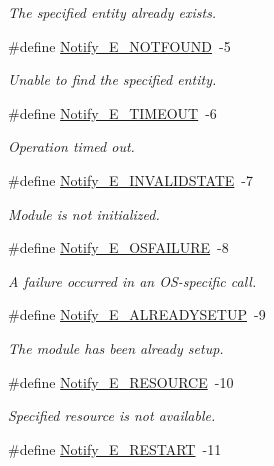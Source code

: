 \begin{DoxyCompactItemize}
\begin{DoxyCompactList}\small\item\em The specified entity already exists. \end{DoxyCompactList}\item 
\#define \hyperlink{_notify_8h_a1c9a19382cfb8c48de9bc3e52e9f7635}{Notify\-\_\-\-E\-\_\-\-N\-O\-T\-F\-O\-U\-N\-D}~-\/5
\begin{DoxyCompactList}\small\item\em Unable to find the specified entity. \end{DoxyCompactList}\item 
\#define \hyperlink{_notify_8h_a546b13cc1d684582073aaa256652fbc4}{Notify\-\_\-\-E\-\_\-\-T\-I\-M\-E\-O\-U\-T}~-\/6
\begin{DoxyCompactList}\small\item\em Operation timed out. \end{DoxyCompactList}\item 
\#define \hyperlink{_notify_8h_a14366d0247e7dda6144f851b60121125}{Notify\-\_\-\-E\-\_\-\-I\-N\-V\-A\-L\-I\-D\-S\-T\-A\-T\-E}~-\/7
\begin{DoxyCompactList}\small\item\em Module is not initialized. \end{DoxyCompactList}\item 
\#define \hyperlink{_notify_8h_a62c9f5fc1a523a1d7efc2685c939a92b}{Notify\-\_\-\-E\-\_\-\-O\-S\-F\-A\-I\-L\-U\-R\-E}~-\/8
\begin{DoxyCompactList}\small\item\em A failure occurred in an O\-S-\/specific call. \end{DoxyCompactList}\item 
\#define \hyperlink{_notify_8h_abd83fd46add74de157a57a8458c67021}{Notify\-\_\-\-E\-\_\-\-A\-L\-R\-E\-A\-D\-Y\-S\-E\-T\-U\-P}~-\/9
\begin{DoxyCompactList}\small\item\em The module has been already setup. \end{DoxyCompactList}\item 
\#define \hyperlink{_notify_8h_aa4f6f673a3eb54bdcd65d1cefccb29e7}{Notify\-\_\-\-E\-\_\-\-R\-E\-S\-O\-U\-R\-C\-E}~-\/10
\begin{DoxyCompactList}\small\item\em Specified resource is not available. \end{DoxyCompactList}\item 
\#define \hyperlink{_notify_8h_a281da75d439e60a04a400bffdaf6c4f6}{Notify\-\_\-\-E\-\_\-\-R\-E\-S\-T\-A\-R\-T}~-\/11

\end{DoxyCompactItemize}
